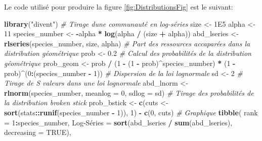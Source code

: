 \documentclass[
  11pt,
  american,
  a4paper,
  extrafontsizes,onecolumn,openright
  ]{memoir}
\newenvironment{Shaded}{\begin{snugshade}}{\end{snugshade}}
\newcommand{\AttributeTok}[1]{\textcolor[rgb]{0.13,0.29,0.53}{#1}}
\newcommand{\CommentTok}[1]{\textcolor[rgb]{0.56,0.35,0.01}{\textit{#1}}}
\newcommand{\ConstantTok}[1]{\textcolor[rgb]{0.56,0.35,0.01}{#1}}
\newcommand{\DecValTok}[1]{\textcolor[rgb]{0.00,0.00,0.81}{#1}}
\newcommand{\FloatTok}[1]{\textcolor[rgb]{0.00,0.00,0.81}{#1}}
\newcommand{\FunctionTok}[1]{\textcolor[rgb]{0.13,0.29,0.53}{\textbf{#1}}}
\newcommand{\NormalTok}[1]{#1}
\newcommand{\OtherTok}[1]{\textcolor[rgb]{0.56,0.35,0.01}{#1}}
\newcommand{\SpecialCharTok}[1]{\textcolor[rgb]{0.81,0.36,0.00}{\textbf{#1}}}
\newcommand{\StringTok}[1]{\textcolor[rgb]{0.31,0.60,0.02}{#1}}
\begin{document}
Le code utilisé pour produire la figure \ref{fig:DistributionsFig} est le suivant:

\scriptsize

\begin{Shaded}
\begin{Highlighting}[]
\FunctionTok{library}\NormalTok{(}\StringTok{"divent"}\NormalTok{)}
\CommentTok{\# Tirage d\textquotesingle{}une communauté en log{-}séries}
\NormalTok{size }\OtherTok{\textless{}{-}} \FloatTok{1E5}
\NormalTok{alpha }\OtherTok{\textless{}{-}} \DecValTok{11}
\NormalTok{species\_number }\OtherTok{\textless{}{-}} \SpecialCharTok{{-}}\NormalTok{alpha }\SpecialCharTok{*} \FunctionTok{log}\NormalTok{(alpha }\SpecialCharTok{/}\NormalTok{ (size }\SpecialCharTok{+}\NormalTok{ alpha))}
\NormalTok{abd\_lseries }\OtherTok{\textless{}{-}} \FunctionTok{rlseries}\NormalTok{(species\_number, size, alpha)}
\CommentTok{\# Part des ressources accaparées dans la distribution géométrique}
\NormalTok{prob }\OtherTok{\textless{}{-}} \FloatTok{0.2}
\CommentTok{\# Calcul des probabilités de la distribution géométrique}
\NormalTok{prob\_geom }\OtherTok{\textless{}{-}}\NormalTok{ prob }\SpecialCharTok{/}\NormalTok{ (}\DecValTok{1} \SpecialCharTok{{-}}\NormalTok{ (}\DecValTok{1} \SpecialCharTok{{-}}\NormalTok{ prob)}\SpecialCharTok{\^{}}\NormalTok{species\_number) }\SpecialCharTok{*}\NormalTok{ (}\DecValTok{1} \SpecialCharTok{{-}}\NormalTok{ prob)}\SpecialCharTok{\^{}}\NormalTok{(}\DecValTok{0}\SpecialCharTok{:}\NormalTok{(species\_number }\SpecialCharTok{{-}} \DecValTok{1}\NormalTok{))}
\CommentTok{\# Dispersion de la loi lognormale}
\NormalTok{sd }\OtherTok{\textless{}{-}} \DecValTok{2}
\CommentTok{\# Tirage de S valeurs dans une loi lognormale}
\NormalTok{abd\_lnorm }\OtherTok{\textless{}{-}} \FunctionTok{rlnorm}\NormalTok{(species\_number, }\AttributeTok{meanlog =} \DecValTok{0}\NormalTok{, }\AttributeTok{sdlog =}\NormalTok{ sd)}
\CommentTok{\# Tirage des probabilités de la distribution broken stick}
\NormalTok{prob\_bstick }\OtherTok{\textless{}{-}} \FunctionTok{c}\NormalTok{(cuts }\OtherTok{\textless{}{-}} \FunctionTok{sort}\NormalTok{(stats}\SpecialCharTok{::}\FunctionTok{runif}\NormalTok{(species\_number }\SpecialCharTok{{-}} \DecValTok{1}\NormalTok{)), }\DecValTok{1}\NormalTok{) }\SpecialCharTok{{-}} \FunctionTok{c}\NormalTok{(}\DecValTok{0}\NormalTok{, cuts)}
\CommentTok{\# Graphique}
\FunctionTok{tibble}\NormalTok{(}
  \AttributeTok{rank =} \DecValTok{1}\SpecialCharTok{:}\NormalTok{species\_number,}
  \StringTok{\textasciigrave{}}\AttributeTok{Log{-}Séries}\StringTok{\textasciigrave{}} \OtherTok{=} \FunctionTok{sort}\NormalTok{(abd\_lseries }\SpecialCharTok{/} \FunctionTok{sum}\NormalTok{(abd\_lseries), }\AttributeTok{decreasing =} \ConstantTok{TRUE}\NormalTok{),}

\end{Highlighting}
\end{Shaded}
\end{document}
